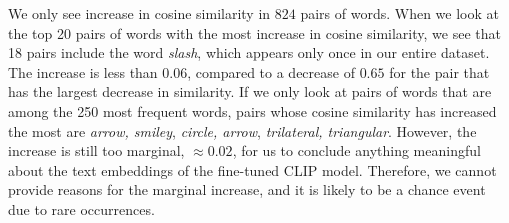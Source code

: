 We only see increase in cosine similarity in $824$ pairs of words. When we look at the top 20 pairs of words with the most increase in cosine similarity, we see that 18 pairs include the word \textit{slash}, which appears only once in our entire dataset. The increase is less than $0.06$, compared to a decrease of $0.65$ for the pair that has the largest decrease in similarity. If we only look at pairs of words that are among the 250 most frequent words, pairs whose cosine similarity has increased the most are \textit{arrow, smiley}, \textit{circle, arrow}, \textit{trilateral, triangular}. However, the increase is still too marginal, $\approx 0.02$, for us to conclude anything meaningful about the text embeddings of the fine-tuned CLIP model. 
Therefore, we cannot provide reasons for the marginal increase, and it is likely to be a chance event due to rare occurrences.   





